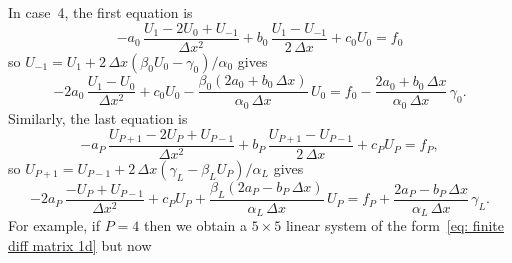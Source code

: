 In case~4, the first equation is 
\[
-a_0\,\frac{U_1-2U_0+U_{-1}}{\Delta x^2}+b_0\,\frac{U_1-U_{-1}}{2\,\Delta x}
    +c_0U_0=f_0
\]
so $U_{-1}=U_1+2\,\Delta x(\beta_0U_0-\gamma_0)/\alpha_0$ gives
\[
-2a_0\,\frac{U_1-U_0}{\Delta x^2}+c_0U_0
    -\frac{\beta_0(2a_0+b_0\,\Delta x)}{\alpha_0\,\Delta x}\,U_0
    =f_0
    -\frac{2a_0+b_0\,\Delta x}{\alpha_0\,\Delta x}\,\gamma_0.
\]
Similarly, the last equation is
\[
-a_P\,\frac{U_{P+1}-2U_P+U_{P-1}}{\Delta x^2}
    +b_P\,\frac{U_{P+1}-U_{P-1}}{2\,\Delta x}+c_PU_P=f_P,
\]
so $U_{P+1}=U_{P-1}+2\,\Delta x(\gamma_L-\beta_LU_P)/\alpha_L$ gives
\[
-2a_P\,\frac{-U_P+U_{P-1}}{\Delta x^2}+c_PU_P
    +\frac{\beta_L(2a_P-b_P\,\Delta x)}{\alpha_L\,\Delta x}\,U_P
    =f_P+\frac{2a_P-b_P\,\Delta x}{\alpha_L\,\Delta x}\,\gamma_L.
\]
For example, if $P=4$ then we obtain a $5\times5$ linear 
system of the form~\eqref{eq: finite diff matrix 1d} but now
